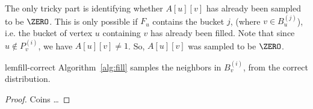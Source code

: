 The only tricky part is identifying whether $A[u][v]$
has already been sampled to be $\ZERO$.
This is only possible if $F_u$ contains the bucket $j$, (where $v\in B_u^{(j)}$),
i.e. the bucket of vertex $u$ containing $v$ has already been filled.
Note that since $u\not\in P_v^{(i)}$, we have $A[u][v]\not=1$.
So, $A[u][v]$ was sampled to be $\ZERO$.
\begin{restatable}{lem}{fill-correct}
\label{lem:fill_correct}
Algorithm~\ref{alg:fill} samples the neighbors in $B_v^{(i)}$,
from the correct distribution.
\end{restatable}
\begin{proof}
Coins \ldots
\end{proof}
\fi

